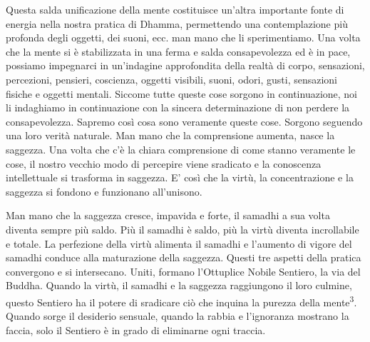 Questa salda unificazione della mente costituisce un'altra importante
fonte di energia nella nostra pratica di Dhamma, permettendo una
contemplazione più profonda degli oggetti, dei suoni, ecc. man mano che
li sperimentiamo. Una volta che la mente si è stabilizzata in una ferma
e salda consapevolezza ed è in pace, possiamo impegnarci in un'indagine
approfondita della realtà di corpo, sensazioni, percezioni, pensieri,
coscienza, oggetti visibili, suoni, odori, gusti, sensazioni fisiche e
oggetti mentali. Siccome tutte queste cose sorgono in continuazione, noi
li indaghiamo in continuazione con la sincera determinazione di non
perdere la consapevolezza. Sapremo così cosa sono veramente queste cose.
Sorgono seguendo una loro verità naturale. Man mano che la comprensione
aumenta, nasce la saggezza. Una volta che c'è la chiara comprensione di
come stanno veramente le cose, il nostro vecchio modo di percepire viene
sradicato e la conoscenza intellettuale si trasforma in saggezza. E'
così che la virtù, la concentrazione e la saggezza si fondono e
funzionano all'unisono.

Man mano che la saggezza cresce, impavida e forte, il samadhi a sua
volta diventa sempre più saldo. Più il samadhi è saldo, più la virtù
diventa incrollabile e totale. La perfezione della virtù alimenta il
samadhi e l'aumento di vigore del samadhi conduce alla maturazione della
saggezza. Questi tre aspetti della pratica convergono e si intersecano.
Uniti, formano l'Ottuplice Nobile Sentiero, la via del Buddha. Quando la
virtù, il samadhi e la saggezza raggiungono il loro culmine, questo
Sentiero ha il potere di sradicare ciò che inquina la purezza della
mente\textsuperscript{3}. Quando sorge il desiderio sensuale, quando la
rabbia e l'ignoranza mostrano la faccia, solo il Sentiero è in grado di
eliminarne ogni traccia.

